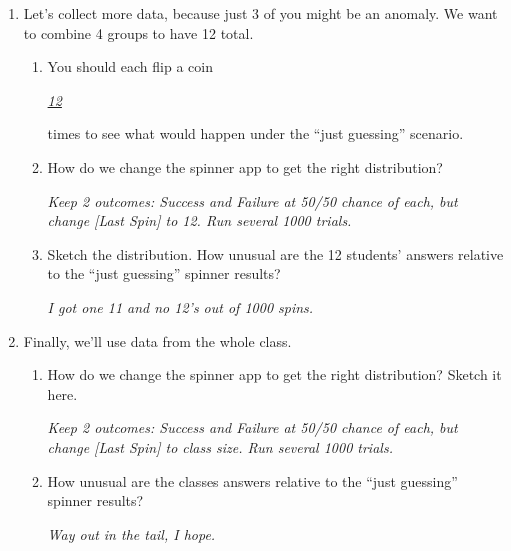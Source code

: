 \begin{enumerate}
  \item Let's collect more data, because just 3 of you might be an
    anomaly.  We want to combine 4 groups to have 12 total. \\
    \begin{enumerate}
    \item You should each flip a coin \underline{\hspace{.5in}} 
\begin{key}
   {\it \underline{12}}
\end{key}
        times to see
      what would happen under the ``just guessing'' scenario. 
    \item How do we change the spinner app to get the right
      distribution?
\begin{students}
  \vspace{2cm}
\end{students}    
\begin{key}
   {\it Keep 2 outcomes: Success and Failure at 50/50 chance of each,
     but change [Last Spin] to 12. Run several 1000 trials. }
\end{key}
   

  \item Sketch the distribution. How unusual are the 12 students'
    answers relative to the ``just guessing'' spinner results?
\begin{students}
  \vspace{1cm}
\end{students}    
\begin{key}
   {\it I got one 11 and no 12's out of 1000 spins.}
\end{key}
    \end{enumerate}


\item Finally, we'll use data from the whole class. 
    \begin{enumerate}
    \item How do we change the spinner app to get the right
      distribution?  Sketch it here.
\begin{students}
  \vspace{2cm}
\end{students}    
\begin{key}
   {\it Keep 2 outcomes: Success and Failure at 50/50 chance of each,
     but change [Last Spin] to class size. Run several 1000 trials. }
\end{key}

\item  How unusual are the classes   answers relative to the ``just guessing'' spinner results?
\begin{students}
  \vspace{1cm}
\end{students}    
\begin{key}
   {\it Way out in the tail, I hope.}
\end{key}
\end{enumerate}
\end{enumerate}


